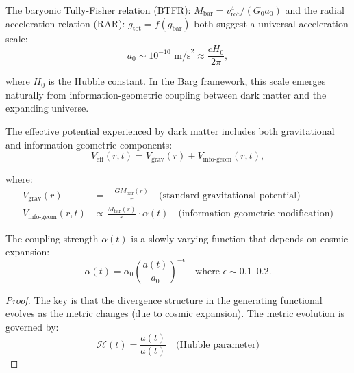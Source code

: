 \begin{theorem}
\label{thm:accelerationScaleEmergence}

The baryonic Tully-Fisher relation (BTFR): $M_{\text{bar}} = v_{\text{rot}}^4 / (G_0 a_0)$ and the radial acceleration relation (RAR): $g_{\text{tot}} = f(g_{\text{bar}})$ both suggest a universal acceleration scale:
\begin{equation}
a_0 \sim 10^{-10} \text{ m/s}^2 \approx \frac{c H_0}{2\pi},
\end{equation}

where $H_0$ is the Hubble constant. In the Barg framework, this scale emerges naturally from information-geometric coupling between dark matter and the expanding universe.

\begin{definition}

The effective potential experienced by dark matter includes both gravitational and information-geometric components:
\begin{equation}
V_{\text{eff}}(r, t) = V_{\text{grav}}(r) + V_{\text{info-geom}}(r, t),
\end{equation}

where:
\begin{align}
V_{\text{grav}}(r) &= -\frac{GM_{\text{bar}}(r)}{r} \quad \text{(standard gravitational potential)} \\
V_{\text{info-geom}}(r, t) &\propto \frac{M_{\text{bar}}(r)}{r} \cdot \alpha(t) \quad \text{(information-geometric modification)}
\end{align}

The coupling strength $\alpha(t)$ is a slowly-varying function that depends on cosmic expansion:
\begin{equation}
\alpha(t) = \alpha_0 \left(\frac{a(t)}{a_0}\right)^{-\epsilon} \quad \text{where } \epsilon \sim 0.1\text{--}0.2.
\end{equation}

\end{definition}

\begin{proof}

The key is that the divergence structure in the generating functional evolves as the metric changes (due to cosmic expansion). The metric evolution is governed by:
\begin{equation}
\mathcal{H}(t) = \frac{\dot{a}(t)}{a(t)} \quad \text{(Hubble parameter)}
\end{equation}


\end{proof}
\end{theorem}

